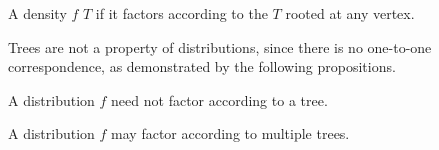 
A density $f$
 $T$
if it factors according to the
$T$ rooted at any vertex.


Trees are not a property of distributions,
since there is no one-to-one correspondence,
as demonstrated by the following propositions.


A distribution $f$ need not factor according to a tree.

A distribution
$f$ may factor according to multiple trees.
\strats
